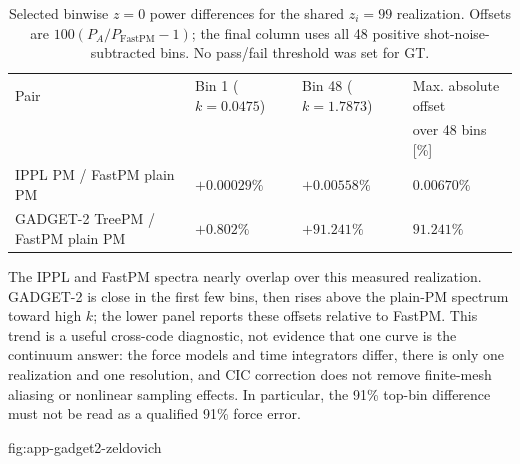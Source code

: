 \begin{table}[htbp]
\centering
\small
\caption{Selected binwise $z=0$ power differences for the shared $z_i=99$
realization.  Offsets are $100(P_A/P_{\mathrm{FastPM}}-1)$; the final column
uses all 48 positive shot-noise-subtracted bins.  No pass/fail threshold was
set for GT.}
\label{tab:app-gadget2-power}
\setlength{\tabcolsep}{3pt}
\begin{tabular}{@{}>{\raggedright\arraybackslash}p{}
                >{\centering\arraybackslash}p{}
                >{\centering\arraybackslash}p{}
                >{\centering\arraybackslash}p{}@{}}
\toprule
Pair & Bin 1 ($k=0.0475$) & Bin 48 ($k=1.7873$) & Max. absolute offset \\
 & [$h\,\mathrm{Mpc}^{-1}$] & [$h\,\mathrm{Mpc}^{-1}$] & over 48 bins [\%] \\
\midrule
IPPL PM / FastPM plain PM & $+0.00029\%$ & $+0.00558\%$ & $0.00670\%$ \\
GADGET-2 TreePM / FastPM plain PM & $+0.802\%$ & $+91.241\%$ & $91.241\%$ \\
\bottomrule
\end{tabular}
\end{table}

The IPPL and FastPM spectra nearly overlap over this measured realization.
GADGET-2 is close in the first few bins, then rises above the plain-PM spectrum
toward high $k$; the lower panel reports these offsets relative to FastPM.
This trend is a useful cross-code diagnostic, not evidence that one curve is
the continuum answer: the force models and time integrators differ, there is
only one realization and one resolution, and CIC correction does not remove
finite-mesh aliasing or nonlinear sampling effects.  In particular, the
91\% top-bin difference must not be read as a qualified 91\% force error.

{fig:app-gadget2-zeldovich}

